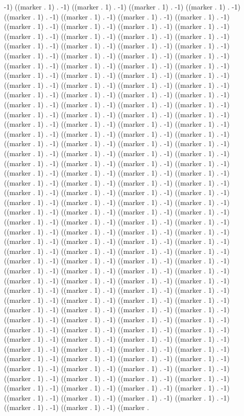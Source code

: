 -1) ((marker . 1) . -1) ((marker . 1) . -1) ((marker . 1) . -1) ((marker . 1) . -1) ((marker . 1) . -1) ((marker . 1) . -1) ((marker . 1) . -1) ((marker . 1) . -1) ((marker . 1) . -1) ((marker . 1) . -1) ((marker . 1) . -1) ((marker . 1) . -1) ((marker . 1) . -1) ((marker . 1) . -1) ((marker . 1) . -1) ((marker . 1) . -1) ((marker . 1) . -1) ((marker . 1) . -1) ((marker . 1) . -1) ((marker . 1) . -1) ((marker . 1) . -1) ((marker . 1) . -1) ((marker . 1) . -1) ((marker . 1) . -1) ((marker . 1) . -1) ((marker . 1) . -1) ((marker . 1) . -1) ((marker . 1) . -1) ((marker . 1) . -1) ((marker . 1) . -1) ((marker . 1) . -1) ((marker . 1) . -1) ((marker . 1) . -1) ((marker . 1) . -1) ((marker . 1) . -1) ((marker . 1) . -1) ((marker . 1) . -1) ((marker . 1) . -1) ((marker . 1) . -1) ((marker . 1) . -1) ((marker . 1) . -1) ((marker . 1) . -1) ((marker . 1) . -1) ((marker . 1) . -1) ((marker . 1) . -1) ((marker . 1) . -1) ((marker . 1) . -1) ((marker . 1) . -1) ((marker . 1) . -1) ((marker . 1) . -1) ((marker . 1) . -1) ((marker . 1) . -1) ((marker . 1) . -1) ((marker . 1) . -1) ((marker . 1) . -1) ((marker . 1) . -1) ((marker . 1) . -1) ((marker . 1) . -1) ((marker . 1) . -1) ((marker . 1) . -1) ((marker . 1) . -1) ((marker . 1) . -1) ((marker . 1) . -1) ((marker . 1) . -1) ((marker . 1) . -1) ((marker . 1) . -1) ((marker . 1) . -1) ((marker . 1) . -1) ((marker . 1) . -1) ((marker . 1) . -1) ((marker . 1) . -1) ((marker . 1) . -1) ((marker . 1) . -1) ((marker . 1) . -1) ((marker . 1) . -1) ((marker . 1) . -1) ((marker . 1) . -1) ((marker . 1) . -1) ((marker . 1) . -1) ((marker . 1) . -1) ((marker . 1) . -1) ((marker . 1) . -1) ((marker . 1) . -1) ((marker . 1) . -1) ((marker . 1) . -1) ((marker . 1) . -1) ((marker . 1) . -1) ((marker . 1) . -1) ((marker . 1) . -1) ((marker . 1) . -1) ((marker . 1) . -1) ((marker . 1) . -1) ((marker . 1) . -1) ((marker . 1) . -1) ((marker . 1) . -1) ((marker . 1) . -1) ((marker . 1) . -1) ((marker . 1) . -1) ((marker . 1) . -1) ((marker . 1) . -1) ((marker . 1) . -1) ((marker . 1) . -1) ((marker . 1) . -1) ((marker . 1) . -1) ((marker . 1) . -1) ((marker . 1) . -1) ((marker . 1) . -1) ((marker . 1) . -1) ((marker . 1) . -1) ((marker . 1) . -1) ((marker . 1) . -1) ((marker . 1) . -1) ((marker . 1) . -1) ((marker . 1) . -1) ((marker . 1) . -1) ((marker . 1) . -1) ((marker . 1) . -1) ((marker . 1) . -1) ((marker . 1) . -1) ((marker . 1) . -1) ((marker . 1) . -1) ((marker . 1) . -1) ((marker . 1) . -1) ((marker . 1) . -1) ((marker . 1) . -1) ((marker . 1) . -1) ((marker . 1) . -1) ((marker . 1) . -1) ((marker . 1) . -1) ((marker . 1) . -1) ((marker . 1) . -1) ((marker . 1) . -1) ((marker . 1) . -1) ((marker . 1) . -1) ((marker . 1) . -1) ((marker . 1) . -1) ((marker . 1) . -1) ((marker . 1) . -1) ((marker . 1) . -1) ((marker . 1) . -1) ((marker . 1) . -1) ((marker . 1) . -1) ((marker . 1) . -1) ((marker . 1) . -1) ((marker . 1) . -1) ((marker . 1) . -1) ((marker . 1) . -1) ((marker . 1) . -1) ((marker . 1) . -1) ((marker . 1) . -1) ((marker . 1) . -1) ((marker . 1) . -1) ((marker . 1) . -1) ((marker . 1) . -1) ((marker . 1) . -1) ((marker . 1) . -1) ((marker . 1) . -1) ((marker . 1) . -1) ((marker . 1) . -1) ((marker . 1) . -1) ((marker . 1) . -1) ((marker . 1) . -1) ((marker . 1) . -1) ((marker . 1) . -1) ((marker . 1) . -1) ((marker . 1) . -1) ((marker . 